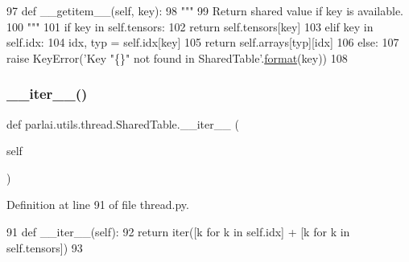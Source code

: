 \begin{DoxyCode}
97     \textcolor{keyword}{def }\_\_getitem\_\_(self, key):
98         \textcolor{stringliteral}{"""}
99 \textcolor{stringliteral}{        Return shared value if key is available.}
100 \textcolor{stringliteral}{        """}
101         \textcolor{keywordflow}{if} key \textcolor{keywordflow}{in} self.tensors:
102             \textcolor{keywordflow}{return} self.tensors[key]
103         \textcolor{keywordflow}{elif} key \textcolor{keywordflow}{in} self.idx:
104             idx, typ = self.idx[key]
105             \textcolor{keywordflow}{return} self.arrays[typ][idx]
106         \textcolor{keywordflow}{else}:
107             \textcolor{keywordflow}{raise} KeyError(\textcolor{stringliteral}{'Key "\{\}" not found in SharedTable'}.\hyperlink{namespaceparlai_1_1chat__service_1_1services_1_1messenger_1_1shared__utils_a32e2e2022b824fbaf80c747160b52a76}{format}(key))
108 
\end{DoxyCode}
\mbox{\label{classparlai_1_1utils_1_1thread_1_1SharedTable_a6c386b5fba3bd7ff0715c808decbaa54}} 
\subsubsection{\texorpdfstring{\+\_\+\+\_\+iter\+\_\+\+\_\+()}{\_\_iter\_\_()}}
{\footnotesize\ttfamily def parlai.\+utils.\+thread.\+Shared\+Table.\+\_\+\+\_\+iter\+\_\+\+\_\+ (\begin{DoxyParamCaption}\item[{}]{self }\end{DoxyParamCaption})}



Definition at line 91 of file thread.\+py.


\begin{DoxyCode}
91     \textcolor{keyword}{def }\_\_iter\_\_(self):
92         \textcolor{keywordflow}{return} iter([k \textcolor{keywordflow}{for} k \textcolor{keywordflow}{in} self.idx] + [k \textcolor{keywordflow}{for} k \textcolor{keywordflow}{in} self.tensors])
93 
\end{DoxyCode}
\mbox{\label{classparlai_1_1utils_1_1thread_1_1SharedTable_a6b6c4f7fb5887de4e2c82b0c11b6d680}} 
